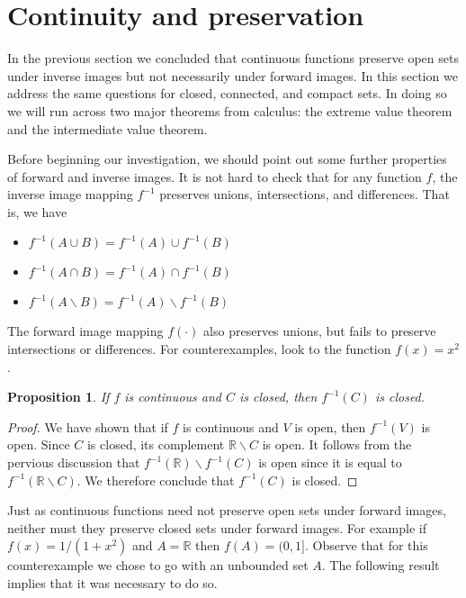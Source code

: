 \documentclass[11pt,oneside]{amsbook}
\newcommand{\RR}{\mathbb R}
\renewcommand{\setminus}{\smallsetminus}
\theoremstyle{definition}
\theoremstyle{plain}
\newtheorem{prop}[thm]{Proposition}
\theoremstyle{definition}
\theoremstyle{remark}
\numberwithin{equation}{section}
\numberwithin{figure}{section}
\begin{document}
\section{Continuity and preservation}

In the previous section we concluded that continuous functions preserve open sets under inverse images but not necessarily under forward images. In this section we address the same questions for closed, connected, and compact sets. In doing so we will run across two major theorems from calculus: the extreme value theorem and the intermediate value theorem.

Before beginning our investigation, we should point out some further properties of forward and inverse images. It is not hard to check that for any function $f$, the inverse image mapping $f^{-1}$ preserves unions, intersections, and differences. That is, we have
\begin{itemize}
\item $f^{-1}(A\cup B)=f^{-1}(A)\cup f^{-1}(B)$
\item $f^{-1}(A\cap B)=f^{-1}(A)\cap f^{-1}(B)$
\item $f^{-1}(A\setminus B)=f^{-1}(A)\setminus f^{-1}(B)$
\end{itemize}
The forward image mapping $f(\cdot)$ also preserves unions, but fails to preserve intersections or differences. For counterexamples, look to the function $f(x)=x^2$.

\begin{prop}
  If $f$ is continuous and $C$ is closed, then $f^{-1}(C)$ is closed.
\end{prop}

\begin{proof}
  We have shown that if $f$ is continuous and $V$ is open, then $f^{-1}(V)$ is open. Since $C$ is closed, its complement $\RR\setminus C$ is open. It follows from the pervious discussion that $f^{-1}(\RR)\setminus f^{-1}(C)$ is open since it is equal to $f^{-1}(\RR\setminus C)$. We therefore conclude that $f^{-1}(C)$ is closed.
\end{proof}

Just as continuous functions need not preserve open sets under forward images, neither must they preserve closed sets under forward images. For example if $f(x)=1/(1+x^2)$ and $A=\RR$ then $f(A)=(0,1]$. Observe that for this counterexample we chose to go with an unbounded set $A$. The following result implies that it was necessary to do so.
\end{document}
